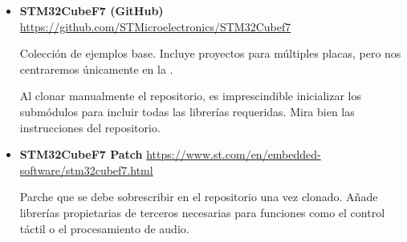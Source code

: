 \documentclass[../main.tex]{subfiles}
\begin{document}
        \begin{itemize}
            \item \textbf{STM32CubeF7 (GitHub)} \url{https://github.com/STMicroelectronics/STM32Cubef7}
                    
                Colección de ejemplos base. Incluye proyectos para múltiples placas, pero nos centraremos únicamente en la \BOARD. 

                Al clonar manualmente el repositorio, es imprescindible inicializar los submódulos para incluir todas las librerías requeridas. Mira bien las instrucciones del repositorio.

            \item \textbf{STM32CubeF7 Patch} \url{https://www.st.com/en/embedded-software/stm32cubef7.html}

                Parche que se debe sobrescribir en el repositorio una vez clonado. Añade librerías propietarias de terceros necesarias para funciones como el control táctil o el procesamiento de audio.
        \end{itemize}
\end{document}
